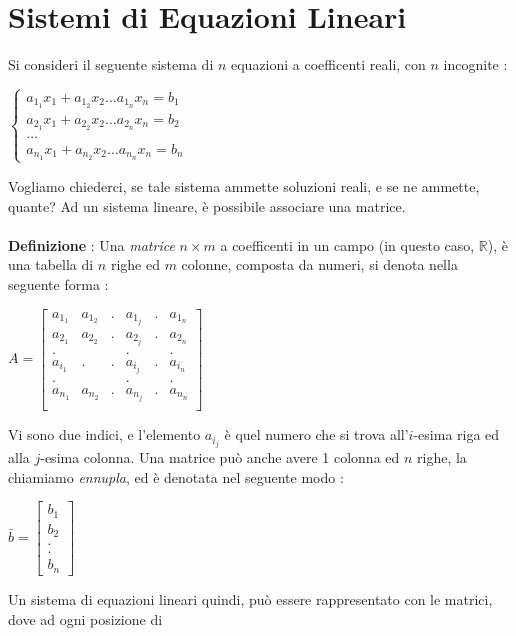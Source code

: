 \documentclass[12pt, letterpaper]{article}
\newcommand{\R}{{\mathbb R}}
\newcommand{\acc}{\\\hphantom{}\\}
\begin{document}
\section{Sistemi di Equazioni Lineari}
Si consideri il seguente sistema di \(n\) equazioni a coefficenti reali, con \(n\) incognite :\begin{center}
    \(\begin{cases}
        a_{1_1}x_1+a_{1_2}x_2\dots a_{1_n}x_n=b_1\\
        a_{2_1}x_1+a_{2_2}x_2\dots a_{2_n}x_n=b_2\\\dots\\
        a_{n_1}x_1+a_{n_2}x_2\dots a_{n_n}x_n=b_n
    \end{cases}\)
\end{center}
Vogliamo chiederci, se tale sistema ammette soluzioni reali, e se ne ammette, quante? Ad un sistema lineare, 
è possibile associare una matrice.\acc 
\textbf{Definizione }: Una \textit{matrice} \(n\times m\) a coefficenti in un campo (in questo caso, \(\R\)), è 
una tabella di \(n\) righe ed \(m\) colonne, composta da numeri, si denota nella seguente forma : \begin{center}
    \(A=\begin{bmatrix}
        a_{1_1}&a_{1_2}&.&a_{1_j}&.& a_{1_n}\\
        a_{2_1}&a_{2_2}& .&a_{2_j}&.&a_{2_n}\\
        .&& &.&&.\\
        a_{i_1}&.& .&a_{ i_j}&.&a_{ i_n}\\
        .&& &.&&.\\
        a_{n_1}&a_{n_2}&.&a_{n_j}&.& a_{n_n}\\
    \end{bmatrix}\)
\end{center}
Vi sono due indici, e l'elemento \(a_{ i_j}\) è quel numero che si trova all'\(i\)-esima riga ed 
alla \(j\)-esima colonna. Una matrice può anche avere 1 colonna ed \(n\) righe, la chiamiamo \textit{ennupla},
ed è denotata nel seguente modo :\begin{center}
    \(\bar b=\begin{bmatrix}
        b_1\\b_2\\.\\.\\b_n
    \end{bmatrix}\)
\end{center} 
Un sistema di equazioni lineari quindi, può essere rappresentato con le matrici, dove ad ogni posizione di 
\end{document}
